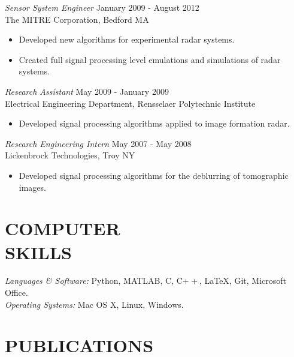  {\sl Sensor System Engineer} \hfill January 2009 - August 2012\\
                The MITRE Corporation, Bedford MA 
                 	\begin{itemize}  \itemsep -2pt %
                	\item Developed new algorithms for experimental radar systems.
                	\item Created full signal processing level emulations and simulations of radar systems.
                \end{itemize}
 
                {\sl Research Assistant} \hfill            May 2009 - January 2009 \\
                Electrical Engineering Department, Rensselaer Polytechnic Institute 
                 \begin{itemize}  \itemsep -2pt %
                 \item Developed signal processing algorithms applied to image formation radar.
                 \end{itemize} 
                {\sl Research Engineering Intern} \hfill        May 2007 - May 2008\\
                Lickenbrock Technologies, Troy NY
                  \begin{itemize}
                   \item Developed signal processing algorithms for the deblurring of tomographic images.
                   \end{itemize} 
\section*{COMPUTER \\ SKILLS} {\sl Languages \& Software:} Python, MATLAB, C, C$++$, \LaTeX, Git, Microsoft Office.\\
                {\sl Operating Systems:} Mac OS X, Linux, Windows. 
 
\section*{PUBLICATIONS}   

